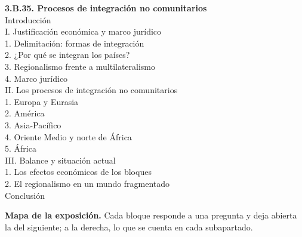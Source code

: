 \documentclass[11pt]{article}
\begin{document}
\begin{esquema}[unbreakable]
\textbf{3.B.35. Procesos de integración no comunitarios}\\[2pt]
Introducción\\
I. Justificación económica y marco jurídico\\
\hspace*{1.5em}1. Delimitación: formas de integración\\
\hspace*{1.5em}2. ¿Por qué se integran los países?\\
\hspace*{1.5em}3. Regionalismo frente a multilateralismo\\
\hspace*{1.5em}4. Marco jurídico\\
II. Los procesos de integración no comunitarios\\
\hspace*{1.5em}1. Europa y Eurasia\\
\hspace*{1.5em}2. América\\
\hspace*{1.5em}3. Asia-Pacífico\\
\hspace*{1.5em}4. Oriente Medio y norte de África\\
\hspace*{1.5em}5. África\\
III. Balance y situación actual\\
\hspace*{1.5em}1. Los efectos económicos de los bloques\\
\hspace*{1.5em}2. El regionalismo en un mundo fragmentado\\
Conclusión
\end{esquema}

\begin{anotaciones}
\textbf{Mapa de la exposición.} Cada bloque responde a una pregunta y deja abierta la del siguiente; a la derecha, lo que se cuenta en cada subapartado.
\begin{infografiacaja}
\caption{Mapa del tema: la pregunta de cada bloque y el hilo que los une}\label{figu:mapa-tema}
\end{infografiacaja}
\end{anotaciones}
\end{document}
